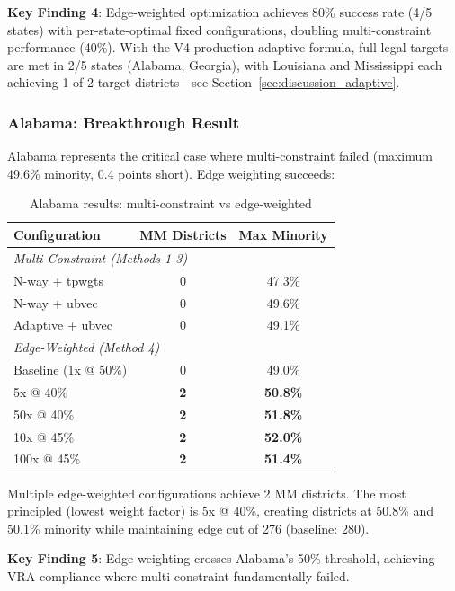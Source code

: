 \textbf{Key Finding 4}: Edge-weighted optimization achieves 80\% success rate (4/5 states) with per-state-optimal fixed configurations, doubling multi-constraint performance (40\%). With the V4 production adaptive formula, full legal targets are met in 2/5 states (Alabama, Georgia), with Louisiana and Mississippi each achieving 1 of 2 target districts---see Section~\ref{sec:discussion_adaptive}.

\subsubsection{Alabama: Breakthrough Result}

Alabama represents the critical case where multi-constraint failed (maximum 49.6\% minority, 0.4 points short). Edge weighting succeeds:

\begin{table}[h]
\centering
\begin{tabular}{lcc}
\toprule
Configuration & MM Districts & Max Minority \\
\midrule
\multicolumn{3}{l}{\textit{Multi-Constraint (Methods 1-3)}} \\
N-way + tpwgts & 0 & 47.3\% \\
N-way + ubvec & 0 & 49.6\% \\
Adaptive + ubvec & 0 & 49.1\% \\
\midrule
\multicolumn{3}{l}{\textit{Edge-Weighted (Method 4)}} \\
Baseline (1x @ 50\%) & 0 & 49.0\% \\
5x @ 40\% & \textbf{2} & \textbf{50.8\%} \\
50x @ 40\% & \textbf{2} & \textbf{51.8\%} \\
10x @ 45\% & \textbf{2} & \textbf{52.0\%} \\
100x @ 45\% & \textbf{2} & \textbf{51.4\%} \\
\bottomrule
\end{tabular}
\caption{Alabama results: multi-constraint vs edge-weighted}
\label{tab:alabama_edge_weighted}
\end{table}

Multiple edge-weighted configurations achieve 2 MM districts. The most principled (lowest weight factor) is 5x @ 40\%, creating districts at 50.8\% and 50.1\% minority while maintaining edge cut of 276 (baseline: 280).

\textbf{Key Finding 5}: Edge weighting crosses Alabama's 50\% threshold, achieving VRA compliance where multi-constraint fundamentally failed.

